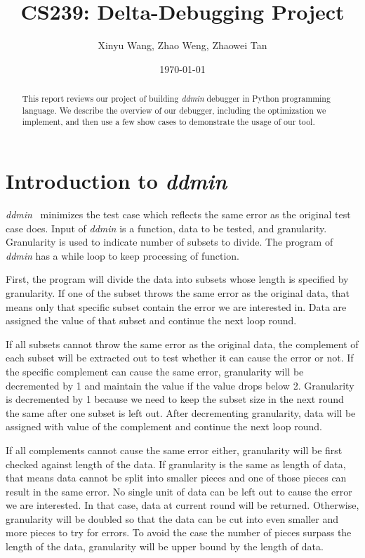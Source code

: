 \documentclass[12pt]{article}
\title{CS239: Delta-Debugging Project}
\author{Xinyu Wang, Zhao Weng, Zhaowei Tan}
\date{\today}
\def\name{\textit{ddmin}\xspace}
\begin{document}
	
\maketitle

\begin{abstract}
This report reviews our project of building \name debugger in Python programming language. We describe the overview of our debugger, including the optimization we implement, and then use a few show cases to demonstrate the usage of our tool.
\end{abstract}

\section{Introduction to \name}
\label{sec:introduction}
\name~\cite{zeller2002simplifying} minimizes the test case which reflects the same error as the original test case does. 
Input of \name is a function, data to be tested, and granularity. Granularity is used to indicate 
number of subsets to divide. The program of \name has a while loop to keep processing of function. 

First, the program will divide the data into subsets whose length is specified by granularity.
If one of the subset throws the same error as the original data, that means only that specific subset contain the error we are interested in. Data are assigned the value of 
that subset and continue the next loop round. 

If all subsets cannot throw the same error as the original data, the complement of each subset 
will be extracted out to test whether it can cause the error or not. If the specific complement can cause the same error, granularity will be decremented by 1 and maintain the value if the value drops below 2. Granularity is decremented by 1 because we need to keep the subset size in the next round the same after one subset is left out. After decrementing granularity, data will be assigned with value of the complement and continue the next loop round.

If all complements cannot cause the same error either, granularity will be first checked against length of the data. If granularity is the same as length of data, that means data cannot be split into smaller pieces and one of those pieces can result in the same error. No single unit of data can be left out to cause the error we are interested. In that case, data at current round will be returned. Otherwise, granularity will be doubled so that the data can be cut into even smaller and more pieces to try for errors. To avoid the case the number of pieces surpass the length of the data, granularity will be upper bound by the length of data.
\end{document}
